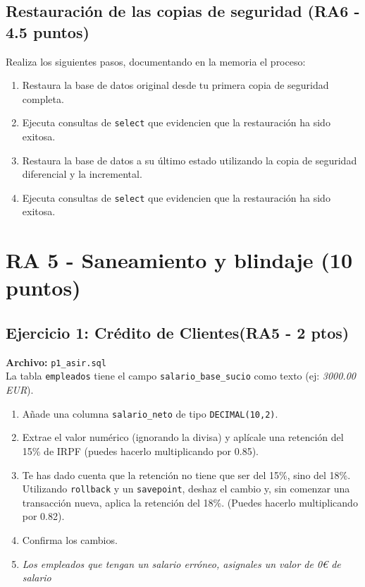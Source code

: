 \documentclass[12pt,a4paper]{article}
\begin{document}
\subsection{Restauración de las copias de seguridad \textcolor{RA6}{(RA6 - 4.5 puntos)}}
Realiza los siguientes pasos, documentando en la memoria el proceso:
\begin{enumerate}
    \item Restaura la base de datos original desde tu primera copia de seguridad completa.
    \item Ejecuta consultas de \texttt{select} que evidencien que la restauración ha sido exitosa.
    \item Restaura la base de datos a su último estado utilizando la copia de seguridad diferencial y la incremental.
    \item Ejecuta consultas de \texttt{select} que evidencien que la restauración ha sido exitosa.
\end{enumerate}




\section{RA 5 - Saneamiento y blindaje (10 puntos)}


\subsection{Ejercicio 1: Crédito de Clientes\textcolor{RA5}{(RA5 - 2 ptos)}}
\textbf{Archivo:} \texttt{p1\_asir.sql} \\
La tabla \texttt{empleados} tiene el campo \texttt{salario\_base\_sucio} como texto (ej: \textit{3000.00 EUR}).
\begin{enumerate}
    \item Añade una columna \texttt{salario\_neto} de tipo \texttt{DECIMAL(10,2)}.
    \item Extrae el valor numérico (ignorando la divisa) y aplícale una retención del 15\% de IRPF (puedes hacerlo multiplicando por 0.85).
    \item Te has dado cuenta que la retención no tiene que ser del 15\%, sino del 18\%. Utilizando \texttt{rollback} y un \texttt{savepoint}, deshaz el cambio y, sin comenzar una transacción nueva, aplica la retención del 18\%. (Puedes hacerlo multiplicando por 0.82).
    \item Confirma los cambios.
    \item \textit{Los empleados que tengan un salario erróneo, asignales un valor de 0€ de salario}
\end{enumerate}
\end{document}

